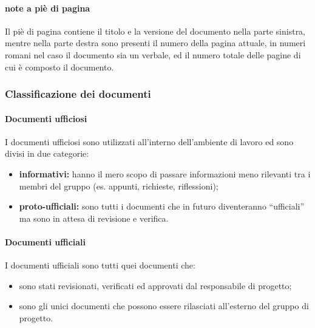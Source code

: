 			\paragraph{note a piè di pagina}
				Il piè di pagina contiene il titolo e la versione del documento nella parte sinistra, mentre nella parte destra sono presenti il numero della pagina attuale, in numeri romani nel caso il documento sia un verbale, ed il numero totale delle pagine di cui è composto il documento.
		\subsubsection{Classificazione dei documenti}
			\paragraph{Documenti ufficiosi}
				I documenti ufficiosi sono utilizzati all'interno dell'ambiente di lavoro ed sono divisi in due categorie:
				\begin{itemize}
					\item \textbf{informativi:} hanno il mero scopo di passare informazioni meno rilevanti tra i membri del gruppo (es. appunti, richieste, riflessioni);
					\item \textbf{proto-ufficiali:} sono tutti i documenti che in futuro diventeranno ``ufficiali'' ma sono in attesa di revisione e verifica.
				\end{itemize}
			\paragraph{Documenti ufficiali}
				I documenti ufficiali sono tutti quei documenti che:
				\begin{itemize}
					\item sono stati revisionati, verificati ed approvati dal responsabile di progetto;
					\item sono gli unici documenti che possono essere rilasciati all'esterno del gruppo di progetto.
				\end{itemize}
